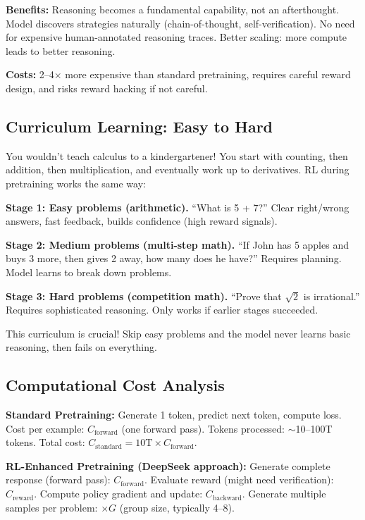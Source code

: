 \begin{chapterenv}
\begin{infobox}
\textbf{Benefits:} Reasoning becomes a fundamental capability, not an afterthought. Model discovers strategies naturally (chain-of-thought, self-verification). No need for expensive human-annotated reasoning traces. Better scaling: more compute leads to better reasoning.

\textbf{Costs:} 2--4$\times$ more expensive than standard pretraining, requires careful reward design, and risks reward hacking if not careful.
\end{infobox}

\subsection{Curriculum Learning: Easy to Hard}

You wouldn't teach calculus to a kindergartener! You start with counting, then addition, then multiplication, and eventually work up to derivatives. RL during pretraining works the same way:

\textbf{Stage 1: Easy problems (arithmetic).} ``What is 5 + 7?'' Clear right/wrong answers, fast feedback, builds confidence (high reward signals).

\textbf{Stage 2: Medium problems (multi-step math).} ``If John has 5 apples and buys 3 more, then gives 2 away, how many does he have?'' Requires planning. Model learns to break down problems.

\textbf{Stage 3: Hard problems (competition math).} ``Prove that $\sqrt{2}$ is irrational.'' Requires sophisticated reasoning. Only works if earlier stages succeeded.

This curriculum is crucial! Skip easy problems and the model never learns basic reasoning, then fails on everything.

\subsection{Computational Cost Analysis}

\textbf{Standard Pretraining:} Generate 1 token, predict next token, compute loss. Cost per example: $C_{\text{forward}}$ (one forward pass). Tokens processed: $\sim$10--100T tokens. Total cost: $C_{\text{standard}} = 10\text{T} \times C_{\text{forward}}$.

\textbf{RL-Enhanced Pretraining (DeepSeek approach):} Generate complete response (forward pass): $C_{\text{forward}}$. Evaluate reward (might need verification): $C_{\text{reward}}$. Compute policy gradient and update: $C_{\text{backward}}$. Generate multiple samples per problem: $\times G$ (group size, typically 4--8).


\end{chapterenv}
